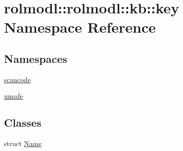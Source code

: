\hypertarget{namespacerolmodl_1_1rolmodl_1_1kb_1_1key}{}\section{rolmodl\+::rolmodl\+::kb\+::key Namespace Reference}
\label{namespacerolmodl_1_1rolmodl_1_1kb_1_1key}
\subsection*{Namespaces}
\begin{DoxyCompactItemize}
\item 
 \mbox{\hyperlink{namespacerolmodl_1_1rolmodl_1_1kb_1_1key_1_1scancode}{scancode}}
\item 
 \mbox{\hyperlink{namespacerolmodl_1_1rolmodl_1_1kb_1_1key_1_1unsafe}{unsafe}}
\end{DoxyCompactItemize}
\subsection*{Classes}
\begin{DoxyCompactItemize}
\item 
struct \mbox{\hyperlink{structrolmodl_1_1rolmodl_1_1kb_1_1key_1_1_name}{Name}}
\end{DoxyCompactItemize}
